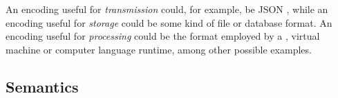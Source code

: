 An encoding useful for \textit{transmission} could, for example, be JSON \cite{rfc7159}, while an encoding useful for \textit{storage} could be some kind of file or database format.
An encoding useful for \textit{processing} could be the format employed by a , virtual machine or computer language runtime, among other possible examples.

\subsection{Semantics}
\label{sec:concepts:semantics}
